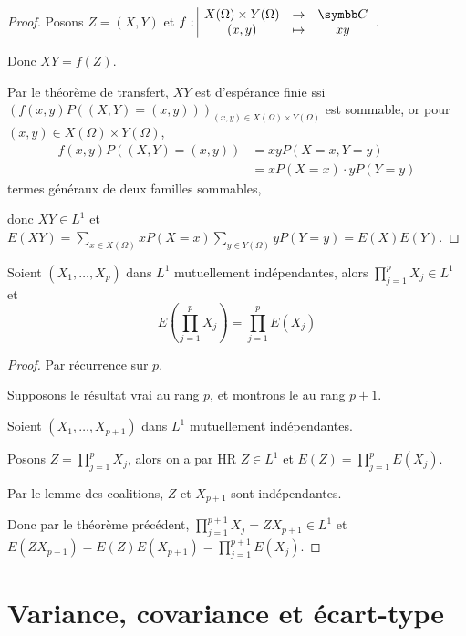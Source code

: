 \begin{proof}
    Posons $Z = (X, Y)$ et $\fonction{f}{X(\Omega) \times Y(\Omega)}{\C}{(x, y)}{xy}$.

    Donc $XY = f(Z)$.

    Par le théorème de transfert, $XY$ est d'espérance finie ssi $(f(x, y)P((X, Y) = (x, y)))_{(x, y) \in X(\Omega) \times Y(\Omega)}$ est sommable, 
    or pour $(x, y) \in X(\Omega) \times Y(\Omega)$, 
    \begin{align}
        f(x, y) P((X, Y) = (x, y)) & = x y P(X = x, Y = y) \\
        & = x P(X = x) \cdot y P(Y = y)
    \end{align}
    termes généraux de deux familles sommables, 
    
    donc $XY \in L^1$ et 
    $E(XY) = \displaystyle \sum_{x \in X(\Omega)} x P(X = x) \sum_{y \in Y(\Omega)} y P(Y = y) = E(X) E(Y)$.
\end{proof}

\begin{proposition}{}{}
    Soient $(X_1, \dots, X_p)$ dans $L^1$ mutuellement indépendantes, alors 
    $\displaystyle \prod_{j = 1}^p X_j \in L^1$ et 
    $$E\left( \prod_{j = 1}^{p } X_j \right) = \prod_{j = 1 }^{ p } E(X_j)$$
\end{proposition}


\begin{proof}
    Par récurrence sur $p$. 

    Supposons le résultat vrai au rang $p$, et montrons le au rang $p + 1$.

    Soient $(X_1, \dots, X_{p + 1})$ dans $L^1$ mutuellement indépendantes.

    Posons $\displaystyle Z = \prod_{j = 1 }^{ p } X_j$, alors on a par HR 
    $Z \in L^1$ et $E(Z) = \prod_{j = 1 }^{ p } E(X_j)$.

    Par le lemme des coalitions, $Z$ et $X_{p + 1}$ sont indépendantes.

    Donc par le théorème précédent, 
    $\displaystyle \prod_{j = 1 }^{p + 1} X_j = Z X_{p + 1} \in L^1$ et
    $E(Z X_{p + 1}) = E(Z) E(X_{p + 1}) = \prod_{j = 1}^{p + 1} E(X_j)$.
\end{proof}

\section{Variance, covariance et écart-type }

